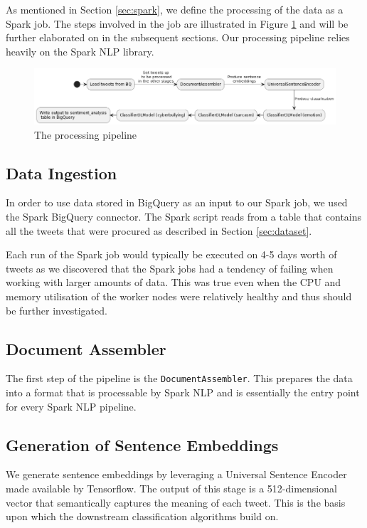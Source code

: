 \documentclass[a4paper,12pt]{article}
\begin{document}
As mentioned in Section \ref{sec:spark}, we define the processing of the data as a Spark job. The steps involved in the job are illustrated in Figure \ref{fig:data-processing-pipeline} and will be further elaborated on in the subsequent sections. Our processing pipeline relies heavily on the Spark NLP library\cite{sparknlp}.

\begin{figure}[h]
\centering
\includegraphics[width=\textwidth]{data-processing.png}
\caption{The processing pipeline}
\label{fig:data-processing-pipeline}
\end{figure}

\subsection{Data Ingestion}
In order to use data stored in BigQuery as an input to our Spark job, we used the Spark BigQuery connector\cite{spark-bigquery-connector}. The Spark script reads from a table that contains all the tweets that were procured as described in Section \ref{sec:dataset}. 

Each run of the Spark job would typically be executed on 4-5 days worth of tweets as we discovered that the Spark jobs had a tendency of failing when working with larger amounts of data. This was true even when the CPU and memory utilisation of the worker nodes were relatively healthy and thus should be further investigated.

\subsection{Document Assembler}
The first step of the pipeline is the \texttt{DocumentAssembler}\cite{document-assembler}. This prepares the data into a format that is processable by Spark NLP and is essentially the entry point for every Spark NLP pipeline.

\subsection{Generation of Sentence Embeddings}
\label{sec:sentence-embeddings}
We generate sentence embeddings by leveraging a Universal Sentence Encoder\cite{universal-sentence-encoder} made available by Tensorflow. The output of this stage is a 512-dimensional vector that semantically captures the meaning of each tweet. This is the basis upon which the downstream classification algorithms build on.
\end{document}

